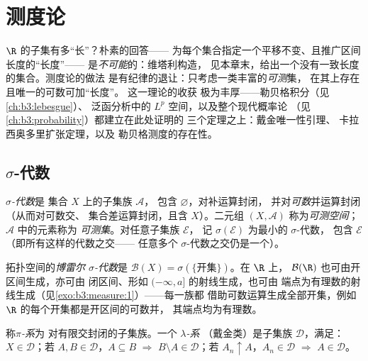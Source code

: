 \chapter{测度论}\label{ch:b3:measure}

$\R$ 的子集有多“长”？朴素的回答——
为每个集合指定一个平移不变、且推广区间长度的“长度”——
是\emph{不可能}的：维塔利构造，
见本章末，给出一个没有一致长度的集合。测度论的做法
是有纪律的退让：只考虑一类丰富的\emph{可测}集，
在其上存在且唯一的可数可加“长度”。
这一理论的收获
极为丰厚——勒贝格积分（见\cref{ch:b3:lebesgue}）、
泛函分析中的 $L^p$ 空间，以及整个现代概率论
（见\cref{ch:b3:probability}）都建立在此处证明的
三个定理之上：戴金唯一性引理、
卡拉西奥多里扩张定理，以及
勒贝格测度的存在性。

\section{$\sigma$-代数}

\begin{definition}\label{def:b3:measure:sigmaalgebra}
\emph{$\sigma$-代数}是
集合 $X$ 上的子集族 $\mathcal A$，
包含 $\varnothing$，对补运算封闭，
并对\emph{可数}并运算封闭（从而对可数交、
集合差运算封闭，且含 $X$）。二元组 $(X, \mathcal A)$
称为\emph{可测空间}；$\mathcal A$ 中的元素称为
\emph{可测集}。对任意子集族 $\mathcal E$，
记 $\sigma(\mathcal E)$ 为最小的 $\sigma$-代数，
包含 $\mathcal E$（即所有这样的代数之交——
任意多个 $\sigma$-代数之交仍是一个）。
\end{definition}

\begin{definition}\label{def:b3:measure:borel}
拓扑空间的\emph{博雷尔 $\sigma$-代数}是
$\mathcal B(X) = \sigma(\{\text{开集}\})$。在 $\R$ 上，
$\mathcal B(\R)$ 也可由开区间生成，亦可由
闭区间、形如 $(-\infty, a]$ 的射线生成，也可由
端点为有理数的射线生成（见\cref{exo:b3:measure:1}）——每一族都
借助可数运算生成全部开集，例如
$\R$ 的每个开集都是开区间的可数并，
其端点均为有理数。
\end{definition}

\begin{definition}\label{def:b3:measure:dynkin}
称\emph{$\pi$-系}为
对有限交封闭的子集族。一个
\emph{$\lambda$-系}
（戴金类）是子集族 $\mathcal D$，满足：$X \in \mathcal
D$；若 $A, B \in \mathcal D$，$A \subseteq B$ $\Rightarrow$ $B
\setminus A \in \mathcal D$；若 $A_n \uparrow A$，$A_n \in
\mathcal D$ $\Rightarrow$ $A \in \mathcal D$。
\end{definition}

